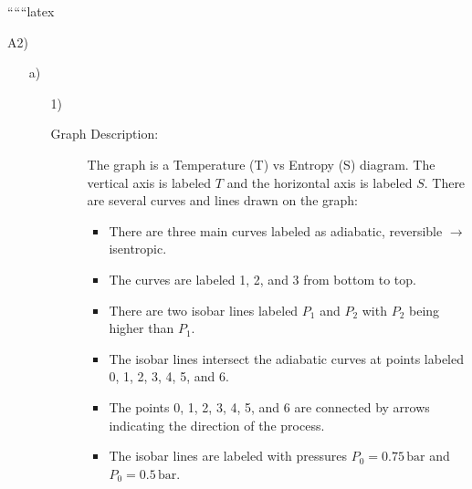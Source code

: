
``````latex


A2)

\begin{itemize}
    \item[a)] 
    \begin{itemize}
        \item[1)] 
        \begin{description}
            \item[Graph Description:] 
            The graph is a Temperature (T) vs Entropy (S) diagram. The vertical axis is labeled \( T \) and the horizontal axis is labeled \( S \). There are several curves and lines drawn on the graph:
            \begin{itemize}
                \item There are three main curves labeled as adiabatic, reversible \(\rightarrow\) isentropic.
                \item The curves are labeled 1, 2, and 3 from bottom to top.
                \item There are two isobar lines labeled \( P_1 \) and \( P_2 \) with \( P_2 \) being higher than \( P_1 \).
                \item The isobar lines intersect the adiabatic curves at points labeled 0, 1, 2, 3, 4, 5, and 6.
                \item The points 0, 1, 2, 3, 4, 5, and 6 are connected by arrows indicating the direction of the process.
                \item The isobar lines are labeled with pressures \( P_0 = 0.75 \, \text{bar} \) and \( P_0 = 0.5 \, \text{bar} \).
            \end{itemize}
        \end{description}
    \end{itemize}
\end{itemize}


